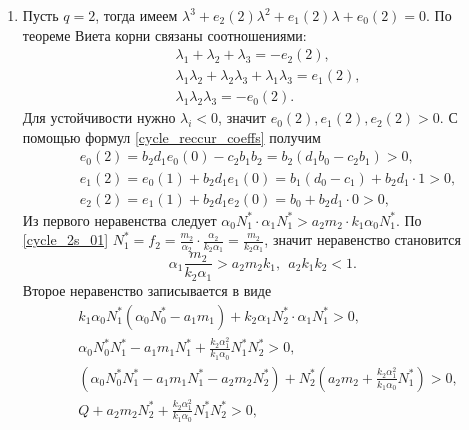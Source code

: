 \begin{enumerate}
\item Пусть \(q=2\), тогда имеем \( \lambda^3 + e_2(2) \lambda^2 + e_1(2) \lambda + e_0(2) = 0 \). По теореме Виета корни связаны соотношениями:
\begin{equation*}
    \begin{split}
        & \lambda_1 + \lambda_2 + \lambda_3 = -e_2(2), \\
        & \lambda_1 \lambda_2 + \lambda_2 \lambda_3 + \lambda_1 \lambda_3 = e_1(2), \\
        & \lambda_1 \lambda_2 \lambda_3 = -e_0(2).
    \end{split}
\end{equation*}
Для устойчивости нужно \(\lambda_i < 0\), значит \( e_0(2), e_1(2), e_2(2) > 0 \). С помощью формул \eqref{cycle_reccur_coeffs} получим
\begin{equation*}
    \begin{split}
        & e_0(2) = b_2 d_{1} e_0(0) - c_2 b_1 b_2 = b_2 ( d_{1} b_0 - c_2 b_1 ) > 0, \\
        & e_1(2) = e_0(1) + b_2 d_1 e_1(0) = b_1 (d_0 - c_1) + b_2 d_1 \cdot 1 > 0, \\
        & e_2(2) = e_1(1) + b_2 d_1 e_2(0) = b_0 + b_2 d_1 \cdot 0 > 0,
    \end{split}
\end{equation*}
Из первого неравенства следует \( \alpha_0 N_1^* \cdot \alpha_1 N^*_1 > a_2 m_2 \cdot k_1 \alpha_0 N^*_1 \). По \eqref{cycle_2s_01} \(N_1^* = f_2 = \frac{m_2}{\alpha_2} \cdot \frac{\alpha_2}{k_2 \alpha_1} = \frac{m_2}{k_2 \alpha_1}\), значит неравенство становится
\begin{equation*}
    \alpha_1 \frac{m_2}{k_2 \alpha_1} > a_2 m_2 k_1, ~~ a_2 k_1 k_2 < 1. 
\end{equation*}
Второе неравенство записывается в виде
\begin{equation*}
    \begin{split}
        & k_1 \alpha_0 N^*_1 ( \alpha_0 N^*_0 - a_1 m_1 ) + k_2 \alpha_1 N^*_2 \cdot \alpha_1 N^*_1 > 0, \\
        & \alpha_0 N^*_0 N^*_1 - a_1 m_1 N^*_1 + \frac{k_2 \alpha_1^2}{k_1 \alpha_0} N^*_1 N^*_2 > 0, \\
        & (\alpha_0 N^*_0 N^*_1 - a_1 m_1 N^*_1 - a_2 m_2 N^*_2) + N^*_2 ( a_2 m_2 + \frac{k_2 \alpha_1^2}{k_1 \alpha_0} N^*_1 ) > 0, \\
        & Q + a_2 m_2 N^*_2 + \frac{k_2 \alpha_1^2}{k_1 \alpha_0} N^*_1 N^*_2 > 0,
    \end{split}
\end{equation*}

\end{enumerate}
